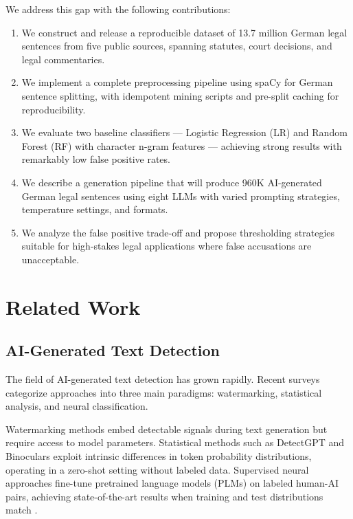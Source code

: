\documentclass[11pt,a4paper]{article}
\begin{document}
We address this gap with the following contributions:
\begin{enumerate}
  \item We construct and release a reproducible dataset of 13.7 million German legal sentences from five public sources, spanning statutes, court decisions, and legal commentaries.
  \item We implement a complete preprocessing pipeline using spaCy for German sentence splitting, with idempotent mining scripts and pre-split caching for reproducibility.
  \item We evaluate two baseline classifiers --- Logistic Regression (LR) and Random Forest (RF) with character n-gram features --- achieving strong results with remarkably low false positive rates.
  \item We describe a generation pipeline that will produce 960K AI-generated German legal sentences using eight LLMs with varied prompting strategies, temperature settings, and formats.
  \item We analyze the false positive trade-off and propose thresholding strategies suitable for high-stakes legal applications where false accusations are unacceptable.
\end{enumerate}

\section{Related Work}

\subsection{AI-Generated Text Detection}

The field of AI-generated text detection has grown rapidly. Recent surveys \cite{wu2025survey, ghosal2023survey, crothers2023machine, tang2024science} categorize approaches into three main paradigms: watermarking, statistical analysis, and neural classification.

Watermarking methods \cite{solaiman2019release} embed detectable signals during text generation but require access to model parameters. Statistical methods such as DetectGPT \cite{ghosal2023survey} and Binoculars \cite{hans2024binoculars} exploit intrinsic differences in token probability distributions, operating in a zero-shot setting without labeled data. Supervised neural approaches fine-tune pretrained language models (PLMs) on labeled human-AI pairs, achieving state-of-the-art results when training and test distributions match \cite{bhattacharjee2024eagle}.
\end{document}
